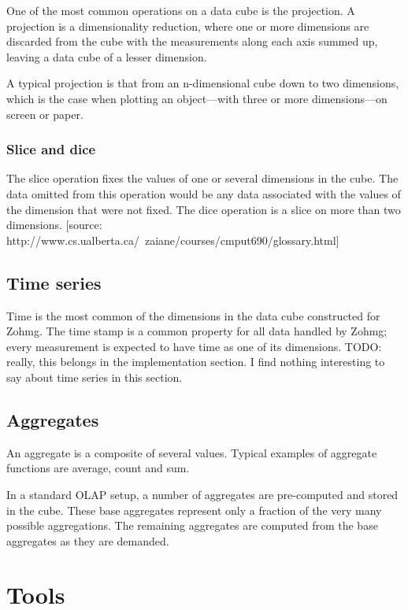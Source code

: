 \documentclass[a4paper,10pt]{book}
\begin{document}
One of the most common operations on a data cube is the projection. A projection is a dimensionality reduction, where one or more dimensions are discarded from the cube with the measurements along each axis summed up, leaving a data cube of a lesser dimension.

A typical projection is that from an n-dimensional cube down to two
dimensions, which is the case when plotting an object---with three or more
dimensions---on screen or paper.


\subsection{Slice and dice}

The slice operation fixes the values of one or several dimensions in the cube. The data omitted from this operation would be any data associated with the values of the dimension that were not fixed. The dice operation is a slice on more than two dimensions. [source: http://www.cs.ualberta.ca/~zaiane/courses/cmput690/glossary.html]



\section{Time series}

Time is the most common of the dimensions in the data cube constructed for Zohmg. The time stamp is a common property for all data handled by Zohmg; every measurement is expected to have time as one of its dimensions. TODO: really, this belongs in the implementation section. I find nothing interesting to say about time series in this section.



\section{Aggregates}

An aggregate is a composite of several values. Typical examples of aggregate functions are average, count and sum.

In a standard OLAP setup, a number of aggregates are pre-computed and stored in the cube. These base aggregates represent only a fraction of the very many possible aggregations. The remaining aggregates are computed from the base aggregates as they are demanded.





\chapter{Tools}
\end{document}
